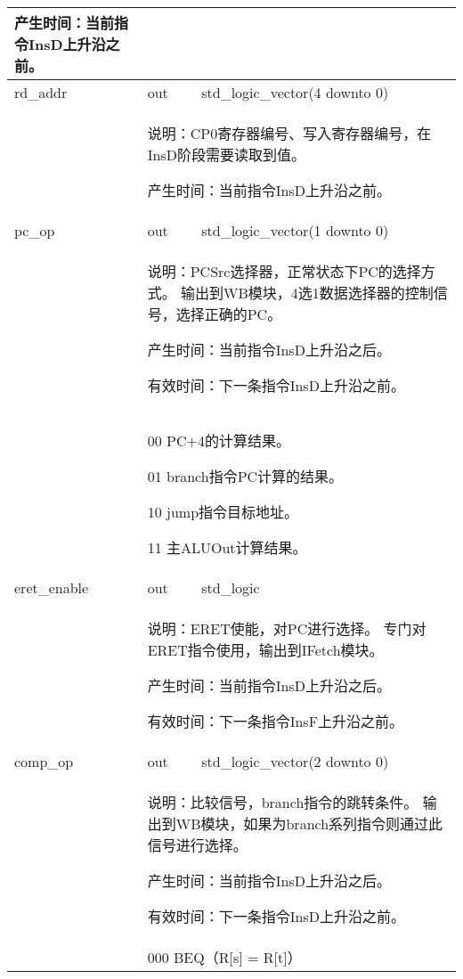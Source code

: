 \begin{tabularx}{\textwidth}{lll}
{                产生时间：当前指令InsD上升沿之前。
            } \\
            \midrule
            rd\_addr        & out       & std\_logic\_vector(4 downto 0) \\
            \cmidrule(l){2-3}
            &
            \multicolumn{2}{X}{
                说明：CP0寄存器编号、写入寄存器编号，在InsD阶段需要读取到值。

                产生时间：当前指令InsD上升沿之前。
            } \\
            \midrule
            pc\_op          & out       & std\_logic\_vector(1 downto 0) \\
            \cmidrule(l){2-3}
            &
            \multicolumn{2}{X}{
                说明：PCSrc选择器，正常状态下PC的选择方式。%
                输出到WB模块，4选1数据选择器的控制信号，选择正确的PC。

                产生时间：当前指令InsD上升沿之后。

                有效时间：下一条指令InsD上升沿之前。 
            } \\
            &
            \multicolumn{2}{X}{
                00 PC+4的计算结果。

                01 branch指令PC计算的结果。

                10 jump指令目标地址。

                11 主ALUOut计算结果。
            } \\
            \midrule
            eret\_enable    & out       & std\_logic \\

            \cmidrule(l){2-3}
            &
            \multicolumn{2}{X}{
                说明：ERET使能，对PC进行选择。%
                专门对ERET指令使用，输出到IFetch模块。

                产生时间：当前指令InsD上升沿之后。

                有效时间：下一条指令InsF上升沿之前。 
            } \\
            \midrule
            comp\_op        & out       & std\_logic\_vector(2 downto 0) \\
            \cmidrule(l){2-3}
            &
            \multicolumn{2}{X}{
                说明：比较信号，branch指令的跳转条件。%
                输出到WB模块，如果为branch系列指令则通过此信号进行选择。

                产生时间：当前指令InsD上升沿之后。

                有效时间：下一条指令InsD上升沿之前。 
            } \\
            &
            \multicolumn{2}{X}{
                000 BEQ（R[s] = R[t]）

}
\end{tabularx}
